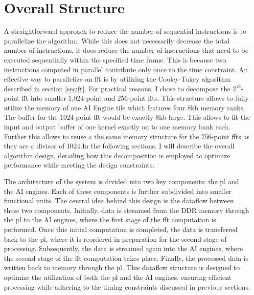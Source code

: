 \section{Overall Structure}
A straightforward approach to reduce the number of sequential instructions is to parallelize the algorithm. While this does not necessarily decrease the total number of instructions, it does reduce the number of instructions that need to be executed sequentially within the specified time frame. This is because two instructions computed in parallel contribute only once to the time constraint. An effective way to parallelize an \ac{fft} is by utilizing the Cooley-Tukey algorithm described in section \ref{sec:ft}. For practical reasons, I chose to decompose the $2^{18}$-point \ac{fft} into smaller 1,024-point and 256-point \ac{fft}s. This structure allows to fully utilize the memory of one AI Engine tile which features four 8kb memory ranks. The buffer for the 1024-point \ac{fft} would be exactly 8kb large. This allows to fit the input and output buffer of one kernel exactly on to one memory bank each. Further this allows to reuse a the same memory structure for the 256-point \ac{fft}s as they are a divisor of 1024.In the following sections, I will describe the overall algorithm design, detailing how this decomposition is employed to optimize performance while meeting the design constraints.\par
The architecture of the system is divided into two key components: the \ac{pl} and the AI engines. Each of these components is further subdivided into smaller functional units. The central idea behind this design is the dataflow between these two components. Initially, data is streamed from the DDR memory through the \ac{pl} to the AI engines, where the first stage of the \ac{fft} computation is performed. Once this initial computation is completed, the data is transferred back to the \ac{pl}, where it is reordered in preparation for the second stage of processing. Subsequently, the data is streamed again into the AI engines, where the second stage of the \ac{fft} computation takes place. Finally, the processed data is written back to memory through the \ac{pl}. This dataflow structure is designed to optimize the utilization of both the \ac{pl} and the AI engines, ensuring efficient processing while adhering to the timing constraints discussed in previous sections.\par
